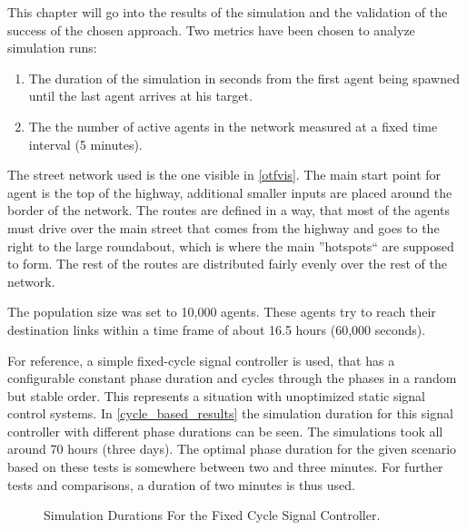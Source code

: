 This chapter will go into the results of the simulation and the validation of the success of the chosen approach. Two metrics have been chosen to analyze simulation runs:

\begin{enumerate}
	\item The duration of the simulation in seconds from the first agent being spawned until the last agent arrives at his target.
	\item The the number of active agents in the network measured at a fixed time interval (5 minutes).
\end{enumerate}

The street network used is the one visible in \autoref{otfvis}. The main start point for agent is the top of the highway, additional smaller inputs are placed around the border of the network. The routes are defined in a way, that most of the agents must drive over the main street that comes from the highway and goes to the right to the large roundabout, which is where the main ''hotspots`` are supposed to form. The rest of the routes are distributed fairly evenly over the rest of the network.

The population size was set to 10,000 agents. These agents try to reach their destination links within a time frame of about 16.5 hours (60,000 seconds).

For reference, a simple fixed-cycle signal controller is used, that has a configurable constant phase duration and cycles through the phases in a random but stable order. This represents a situation with unoptimized static signal control systems. In \autoref{cycle_based_results} the simulation duration for this signal controller with different phase durations can be seen. The simulations took all around 70 hours (three days). The optimal phase duration for the given scenario based on these tests is somewhere between two and three minutes. For further tests and comparisons, a duration of two minutes is thus used.

\begin{figure}
	\centering	
	\caption{Simulation Durations For the Fixed Cycle Signal Controller.}
	\label{cycle_based_results}
\end{figure}

